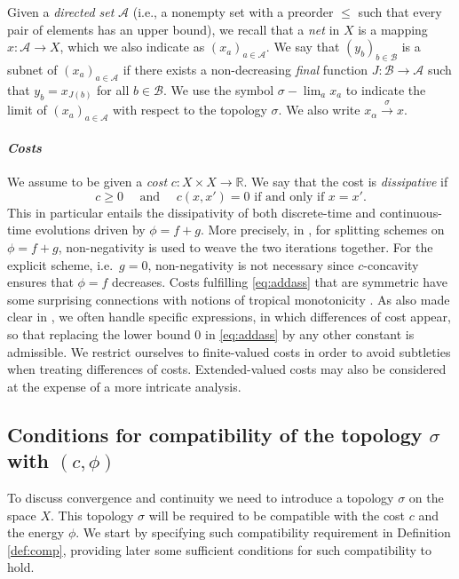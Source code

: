 \documentclass[reqno]{amsart}
\theoremstyle{plain}
\theoremstyle{remark}
\theoremstyle{plain}
\numberwithin{equation}{section}
\theoremstyle{remark}
\newcommand{\YY}{X}
\begin{document}
Given a {\it directed set} $\mathcal{A}$ (i.e., a nonempty set with a preorder $\leq$  such that every pair of elements has an upper bound), we recall that a {\it net} in $X$ is a mapping $x:\mathcal{A} \to X$, which we also indicate as $(x_a)_{a\in \mathcal A}$. We say that $(y_b)_{b\in \mathcal B}$ is a  subnet   of $(x_a)_{a\in \mathcal A}$  if  there exists a non-decreasing {\it final} function $J:\mathcal B \to \mathcal A$ such that $y_b=x_{J(b)}$ for all $b\in \mathcal B$. We use the symbol $\sigma{-}\lim_a x_a$ to indicate the limit of $(x_a)_{a\in \mathcal A}$ with respect to the topology $\sigma$.  We also write $x_\alpha \xrightarrow[]{\sigma} x$. 
\medskip

\paragraph{\em\bfseries Costs}
We assume to be given a {\it cost} $c:X\times \YY \to \mathbb{R}$. We say that the cost is {\it dissipative} if  
    \begin{equation}\label{eq:addass}\tag{Diss}
     c \ge 0 \quad \text{ and } \quad c(x,x')=0 \text{ if and only if } x=x'.
    \end{equation}
    This in particular entails the dissipativity of both discrete-time and continuous-time evolutions driven by 
    $\phi=f+g$.  
    More precisely,  in  , for splitting schemes on $\phi=f+g$, non-negativity is used to weave the two iterations together. For  the  explicit scheme, i.e.\ $g=0$, non-negativity is not necessary since $c$-concavity  ensures that $\phi=f$ decreases. Costs fulfilling \eqref{eq:addass} that are symmetric have some surprising connections with notions of tropical monotonicity \cite[Proposition 4.1]{aubin2022tropical}. As also made clear in , we often  handle specific expressions, in which differences of cost appear,  so  that replacing the lower bound $0$ in \eqref{eq:addass} by any other constant is admissible.  We restrict ourselves to finite-valued costs in order to avoid subtleties when treating differences of costs. Extended-valued costs may also be considered at the expense of a more intricate analysis. 





\subsection{Conditions for compatibility of the topology \texorpdfstring{$\sigma$}{s} with \texorpdfstring{$(c, \phi)$}{c,p}}\label{sec:comp} To discuss convergence and continuity  we need to introduce a topology $\sigma$ on the space $X$. This topology $\sigma$ will be required to be compatible with the cost $c$ and the energy $\phi$. We start by specifying such compatibility requirement in Definition \ref{def:comp}, providing later some sufficient conditions  for such compatibility to hold.  
\end{document}
